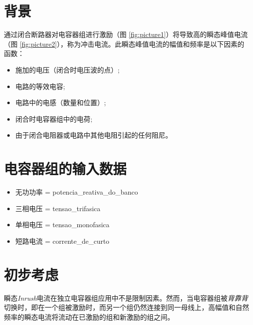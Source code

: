 \documentclass[a4paper]{article}
\begin{document}
	
	\section{背景}
	通过闭合断路器对电容器组进行激励（图 \ref{fig:picture1}）将导致高的瞬态峰值电流（图 \ref{fig:picture2}），称为冲击电流。此瞬态峰值电流的幅值和频率是以下因素的函数：
	\begin{itemize}[label=\textendash]
		\item 施加的电压（闭合时电压波的点）;
		\item 电路的等效电容;
		\item 电路中的电感（数量和位置）;
		\item 闭合时电容器组中的电荷;
		\item 由于闭合电阻器或电路中其他电阻引起的任何阻尼。
	\end{itemize}
	
	\section{电容器组的输入数据}
	\begin{itemize}[label=\textendash]
		\item 无功功率  = {{potencia_reativa_do_banco}}
		\item 三相电压  = {{tensao_trifasica}}
		\item 单相电压  = {{tensao_monofasica}}
		\item 短路电流  = {{corrente_de_curto}}
	\end{itemize}
	
	\begin{center}
	\end{center}
	
	\section{初步考虑}
	
	瞬态\textit{Inrush}电流在独立电容器组应用中不是限制因素。然而，当电容器组被\textit{背靠背}切换时，即在一个组被激励时，而另一个组仍然连接到同一母线上，高幅值和自然频率的瞬态电流将流动在已激励的组和新激励的组之间。
	
\end{document}
